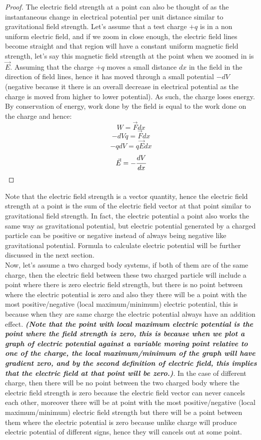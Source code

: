 \documentclass{article}
\begin{document}
\begin{proof}
The electric field strength at a point can also be thought of as the instantaneous change in electrical potential per unit distance similar to gravitational field strength. Let's assume that a test charge $+q$ is in a non uniform electric field, and if we zoom in close enough, the electric field lines become straight and that region will have a constant uniform magnetic field strength, let's say this magnetic field strength at the point when we zoomed in is $\vec{E}$. Assuming that the charge $+q$ moves a small distance $dx$ in the field in the direction of field lines, hence it has moved through a small potential $-dV$ (negative because it there is an overall decrease in electrical potential as the charge is moved from higher to lower potential). As such, the charge loses energy. By conservation of energy, work done by the field is equal to the work done on the charge and hence:
$$W=\vec{F}dx$$
$$-dVq=\vec{F}dx$$
$$-qdV=q\vec{E}dx$$
$$\vec{E}=-\cfrac{dV}{dx}$$
\end{proof}
Note that the electric field strength is a vector quantity, hence the electric field strength at a point is the sum of the electric field vector at that point similar to gravitational field strength. In fact, the electric potential a point also works the same way as gravitational potential, but electric potential generated by a charged particle can be positive or negative instead of always being negative like gravitational potential. Formula to calculate electric potential will be further discussed in the next section. \\

Now, let's assume a two charged body systems, if both of them are of the same charge, then the electric field between these two charged particle will include a point where there is zero electric field strength, but there is no point between where the electric potential is zero and also they there will be a point with the most positive/negative (local maximum/minimum) electric potential, this is because when they are same charge the electric potential always have an addition effect. \textbf{\textit{(Note that the point with local maximum electric potential is the point where the field strength is zero, this is because when we plot a graph of electric potential against a variable moving point relative to one of the charge, the local maximum/minimum of the graph will have gradient zero, and by the second definition of electric field, this implies that the electric field at that point will be zero.)}}. In the case of different charge, then there will be no point between the two charged body where the electric field strength is zero because the electric field vector can never cancels each other, moreover there will be at point with the most positive/negative (local maximum/minimum) electric field strength but there will be a point between them where the electric potential is zero because unlike charge will produce electric potential of different signs, hence they will cancels out at some point. 
\end{document}

